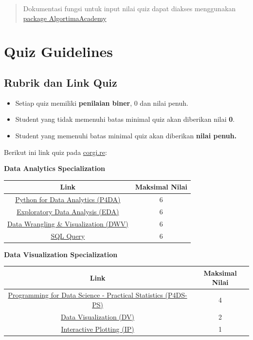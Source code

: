 \documentclass[
]{book}
\providecommand{\tightlist}{%
  \setlength{\itemsep}{0pt}\setlength{\parskip}{0pt}}
\begin{document}
\begin{quote}
Dokumentasi fungsi untuk input nilai quiz dapat diakses menggunakan \href{https://github.com/Davidlimbong/AlgoritmaAcademy}{package AlgortimaAcademy}
\end{quote}

\hypertarget{quiz-guidelines}{%
\section{Quiz Guidelines}\label{quiz-guidelines}}

\hypertarget{rubrik-dan-link-quiz}{%
\subsection{Rubrik dan Link Quiz}\label{rubrik-dan-link-quiz}}

\begin{itemize}
\tightlist
\item
  Setiap quiz memiliki \textbf{penilaian biner}, 0 dan nilai penuh.
\item
  Student yang tidak memenuhi batas minimal quiz akan diberikan nilai \textbf{0}.
\item
  Student yang memenuhi batas minimal quiz akan diberikan \textbf{nilai penuh.}
\end{itemize}

Berikut ini link quiz pada \url{corgi.re}:

\textbf{Data Analytics Specialization}

\begin{longtable}[]{@{}cc@{}}
\toprule
\textbf{Link} & \textbf{Maksimal Nilai}\tabularnewline
\midrule
\endhead
\href{https://corgi.re/courses/ttnsy/quiz_PYW1}{Python for Data Analytics (P4DA)} & 6\tabularnewline
\href{https://corgi.re/courses/ttnsy/quiz_PYW2}{Exploratory Data Analysis (EDA)} & 6\tabularnewline
\href{https://corgi.re/courses/ttnsy/quiz_PYW3}{Data Wrangling \& Visualization (DWV)} & 6\tabularnewline
\href{https://corgi.re/courses/ttnsy/quiz_PYW4}{SQL Query} & 6\tabularnewline
\bottomrule
\end{longtable}

\textbf{Data Visualization Specialization}

\begin{longtable}[]{@{}cc@{}}
\toprule
\textbf{Link} & \textbf{Maksimal Nilai}\tabularnewline
\midrule
\endhead
\href{https://corgi.re/courses/Davidlimbong/P4DS-PS}{Programming for Data Science - Practical Statistics (P4DS-PS)} & 4\tabularnewline
\href{https://corgi.re/courses/Argaadya/data-visualization}{Data Visualization (DV)} & 2\tabularnewline
\href{https://corgi.re/courses/Davidlimbong/InteractivePlotting}{Interactive Plotting (IP)} & 1\tabularnewline
\bottomrule
\end{longtable}
\end{document}
